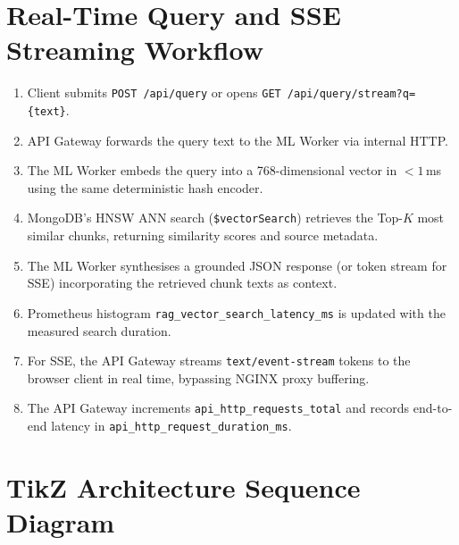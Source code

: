 \documentclass[12pt,a4paper]{report}
\begin{document}
\section{Real-Time Query and SSE Streaming Workflow}

\begin{enumerate}[leftmargin=2cm]
  \item Client submits \texttt{POST /api/query} or opens
        \texttt{GET /api/query/stream?q=\{text\}}.
  \item API Gateway forwards the query text to the ML Worker via internal HTTP.
  \item The ML Worker embeds the query into a 768-dimensional vector in
        $<1$\,ms using the same deterministic hash encoder.
  \item MongoDB's HNSW ANN search (\texttt{\$vectorSearch}) retrieves the
        Top-$K$ most similar chunks, returning similarity scores and source
        metadata.
  \item The ML Worker synthesises a grounded JSON response (or token stream
        for SSE) incorporating the retrieved chunk texts as context.
  \item Prometheus histogram \texttt{rag\_vector\_search\_latency\_ms} is
        updated with the measured search duration.
  \item For SSE, the API Gateway streams \texttt{text/event-stream} tokens
        to the browser client in real time, bypassing NGINX proxy buffering.
  \item The API Gateway increments \texttt{api\_http\_requests\_total} and
        records end-to-end latency in \texttt{api\_http\_request\_duration\_ms}.
\end{enumerate}

\section{TikZ Architecture Sequence Diagram}
\end{document}

